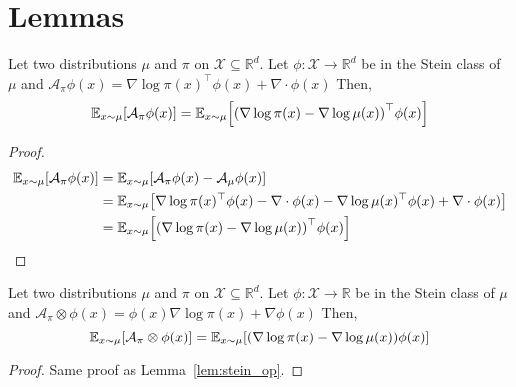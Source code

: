 \documentclass[runningheads,a4paper]{llncs}
\newcommand{\R}{\mathbb{R}}
\newcommand{\E}{\mathbb{E}}
\newcommand{\X}{\mathcal{X}}
\newcommand{\A}{\mathcal{A}}
\DeclarePairedDelimiter{\pare}{(}{)}
\DeclarePairedDelimiter{\sq}{[}{]}
\begin{document}



\appendix
\section{Lemmas}
\begin{lemma}
  Let two distributions $\mu$ and $\pi$ on $\X \subseteq \R^d$.
  Let $\phi: \X \to \R^d$ be in the Stein class of $\mu$ and
  $\A_\pi \phi(x) = \nabla \log \pi(x)^\top \phi(x) + \nabla \cdot \phi(x)$ Then,
  $$
  \E_{x \sim \mu}\sq*{ \A_\pi \phi(x) } =
    \E_{x \sim \mu}\sq*{ \pare*{\nabla \log \pi(x) - \nabla \log \mu(x)}^\top \phi(x) }
  $$
  \begin{proof}
    \begin{align*}
      \E_{x \sim \mu}\sq*{ \A_\pi \phi(x) } &= \E_{x \sim \mu}\sq*{ \A_\pi \phi(x) - \A_\mu \phi(x) } \\
      &= \E_{x \sim \mu}\sq*{ \nabla \log \pi(x)^\top \phi(x) - \nabla \cdot \phi(x) -
      \nabla \log \mu(x)^\top \phi(x) + \nabla \cdot \phi(x) } \\
      &= \E_{x \sim \mu}\sq*{ \pare*{\nabla \log \pi(x) - \nabla \log \mu(x)}^\top \phi(x) }
    \end{align*}
  \end{proof}
  \label{lem:stein_op}
\end{lemma}

\begin{lemma}
  Let two distributions $\mu$ and $\pi$ on $\X \subseteq \R^d$.
  Let $\phi: \X \to \R$ be in the Stein class of $\mu$ and
  $\A_\pi \otimes \phi(x) = \phi(x) \nabla \log \pi(x) + \nabla \phi(x)$ Then,
  $$
  \E_{x \sim \mu}\sq*{ \A_\pi \otimes \phi(x) } =
    \E_{x \sim \mu}\sq*{ \pare*{\nabla \log \pi(x) - \nabla \log \mu(x)} \phi(x) }
  $$
  \begin{proof}
    Same proof as Lemma~\ref{lem:stein_op}.
  \end{proof}
  \label{lem:stein_op_scalar}
\end{lemma}
\end{document}
